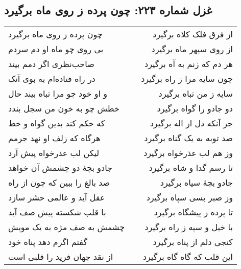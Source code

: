 \begin{center}
\section*{غزل شماره ۲۲۳: چون پرده ز روی ماه برگیرد}
\label{sec:223}
\begin{longtable}{l p{0.5cm} r}
چون پرده ز روی ماه برگیرد
&&
از فرق فلک کلاه برگیرد
\\
بی روی چو ماه او دم سردم
&&
از روی سپهر ماه برگیرد
\\
صاحب‌نظری اگر دمم بیند
&&
هر دم که زنم به آه برگیرد
\\
در راه فتاده‌ام به بوی آنک
&&
چون سایه مرا ز راه برگیرد
\\
و او خود چو مرا تباه بیند حال
&&
سایه ز من تباه برگیرد
\\
خطش چو به خون من سجل بندد
&&
دو جادو را گواه برگیرد
\\
که حکم کند بدین گواه و خط
&&
جز آنکه دل از اله برگیرد
\\
هرگاه که زلف او نهد جرمم
&&
صد توبه به یک گناه برگیرد
\\
لیکن لب عذرخواه پیش آرد
&&
وز هم لب عذرخواه برگیرد
\\
جادو بچهٔ دو چشمش آن خواهد
&&
تا رسم گدا و شاه برگیرد
\\
صد بالغ را ببین که چون از راه
&&
جادو بچهٔ سیاه برگیرد
\\
عقل آید و عالمی حشر سازد
&&
وز صبر بسی سپاه برگیرد
\\
با قلب شکسته پیش صف آید
&&
تا پرده ز پیشگاه برگیرد
\\
چشمش به صف مژه به یک مویش
&&
با خیل و سپه ز راه برگیرد
\\
گفتم اگرم دهد پناه خود
&&
کنجی دلم از پناه برگیرد
\\
از نقد جهان فرید را قلبی است
&&
این قلب که گاه گاه برگیرد
\\
\end{longtable}
\end{center}
